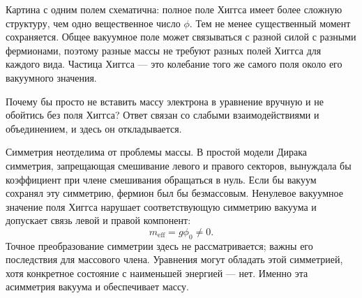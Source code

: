 \begin{classroomqa}
\end{classroomqa}

Картина с одним полем схематична: полное поле Хиггса имеет более сложную структуру, чем одно вещественное число \(\phi\). Тем не менее существенный момент сохраняется. Общее вакуумное поле может связываться с разной силой с разными фермионами, поэтому разные массы не требуют разных полей Хиггса для каждого вида. Частица Хиггса — это колебание того же самого поля около его вакуумного значения.

Почему бы просто не вставить массу электрона в уравнение вручную и не обойтись без поля Хиггса? Ответ связан со слабыми взаимодействиями и объединением, и здесь он откладывается.

\begin{classroomqa}
\end{classroomqa}

\begin{classroomqa}
\end{classroomqa}

Симметрия неотделима от проблемы массы. В простой модели Дирака симметрия, запрещающая смешивание левого и правого секторов, вынуждала бы коэффициент при члене смешивания обращаться в нуль. Если бы вакуум сохранял эту симметрию, фермион был бы безмассовым. Ненулевое вакуумное значение поля Хиггса нарушает соответствующую симметрию вакуума и допускает связь левой и правой компонент:
\begin{equation}
m_{\mathrm{eff}}=g\phi_0\neq0.
\end{equation}
Точное преобразование симметрии здесь не рассматривается; важны его последствия для массового члена. Уравнения могут обладать этой симметрией, хотя конкретное состояние с наименьшей энергией — нет. Именно эта асимметрия вакуума и обеспечивает массу.

